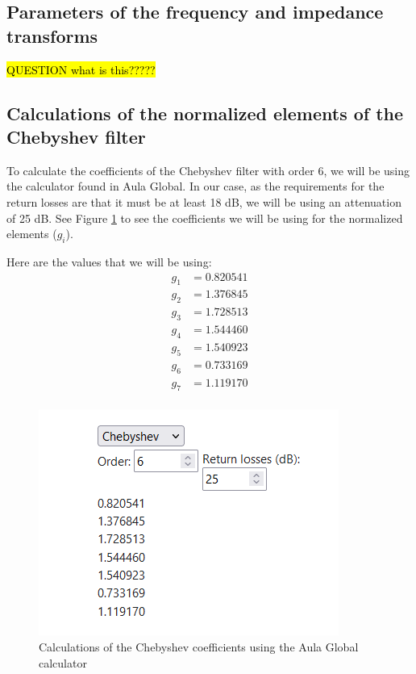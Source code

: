 \documentclass[12pt]{report} %
\newcommand{\question}[1]{\sethlcolor{red}\hl{QUESTION #1}}
\begin{document}
\subsection{Parameters of the frequency and impedance transforms}

\question{what is this?????}

\subsection{Calculations of the normalized elements of the Chebyshev filter}

To calculate the coefficients of the Chebyshev filter with order 6, we will be using the calculator found in Aula Global. In our case, as the requirements for the return losses are that it must be at least 18 dB, we will be using an attenuation of 25 dB. See Figure \ref{fig:design_circuit_elements:chebyshev_filter_normalized_elements_calculator} to see the coefficients we will be using for the normalized elements ($g_i$). 

Here are the values that we will be using:
\begin{align*}
g_1 &= 0.820541 \\
g_2 &= 1.376845 \\
g_3 &= 1.728513 \\
g_4 &= 1.544460 \\
g_5 &= 1.540923 \\
g_6 &= 0.733169 \\
g_7 &= 1.119170 \\
\end{align*}

\begin{figure}
    \centering
    \includegraphics[width=1\linewidth]{images//design_circuit_elements/chebyshev_filter_normalized_elements_calculator.png}
    \caption{Calculations of the Chebyshev coefficients using the Aula Global calculator}
    \label{fig:design_circuit_elements:chebyshev_filter_normalized_elements_calculator}
\end{figure}
\end{document}
